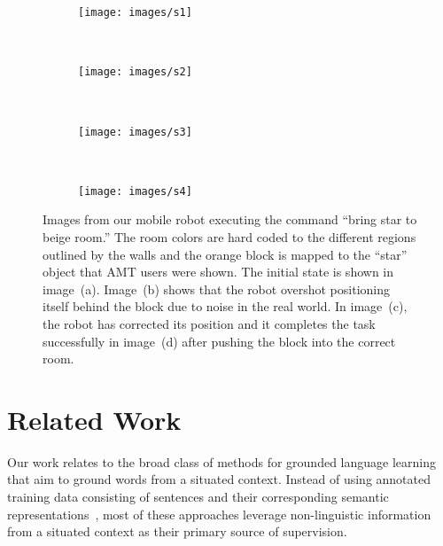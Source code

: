 \documentclass[conference]{IEEEtran}
\begin{document}
\begin{figure}
        \centering
        \begin{subfigure}[b]{0.23\textwidth}
                \texttt{[image: images/s1]}
                \caption{}
                \label{fig:real1}
        \end{subfigure}%
        ~ %
        \begin{subfigure}[b]{0.23\textwidth}
                \texttt{[image: images/s2]}
                \caption{}
                \label{fig:real2}
        \end{subfigure}
        ~ %
        \begin{subfigure}[b]{0.23\textwidth}
                \texttt{[image: images/s3]}
                \caption{}
                \label{fig:real3}
        \end{subfigure}
        ~
         \begin{subfigure}[b]{0.23\textwidth}
                \texttt{[image: images/s4]}
                \caption{}
                \label{fig:real4}
        \end{subfigure}
        \caption{Images from our mobile robot executing the command ``bring star to beige room.'' The room colors are hard coded to the different regions outlined by the walls and the orange block is mapped to the ``star'' object that AMT users were shown. The initial state is shown in image~(a). Image~(b) shows that the robot overshot positioning itself behind the block due to noise in the real world. In image~(c), the robot has corrected its position and it completes the task successfully in image~(d) after pushing the block into the correct room.} \label{fig:real}
\end{figure}

\section{Related Work}
\label{s:rel_work}


Our work relates to the broad class of methods for grounded language learning that aim to ground words from a situated context.
Instead of using annotated training data consisting of sentences and their corresponding semantic representations~\cite{kate06,wong07,zettlemoyer05,zettlemoyer09}, 
most of these approaches leverage non-linguistic information from a situated context as their primary source of supervision. 
\end{document}
